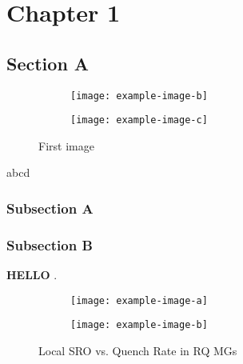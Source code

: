 \chapter{Chapter 1} \label{c:dev}

\lipsum[2-4]

\section{Section A} \label{s:simtestMG}
\lipsum[4] \par

\begin{figure} %
	\centering
	\begin{subfigure}{\textheight} \centering \texttt{[image: example-image-b]}
		 \end{subfigure}%
	\vfill
	\begin{subfigure}{\textheight} \centering \texttt{[image: example-image-c]}
		 \end{subfigure}
	\caption{First image}
	\label{f:rdf_mgs}
\end{figure}

\cbstart
abcd
\cbend 

\lipsum[3] \par

\subsection{Subsection A} \label{s:rdf-mgs}
\begin{changebar}
\lipsum[6] \par

%
\subsection{Subsection B} \label{s:voro-mgs}
\lipsum[5] \par
\end{changebar}

\textbf{HELLO}
\lipsum[3]. \par
	
	\begin{figure}[h] %
		\centering
		\begin{subfigure}{0.45\linewidth} \centering \texttt{[image: example-image-a]}
			\subcaption{} \end{subfigure}%
		\begin{subfigure}{0.45\linewidth} \centering \texttt{[image: example-image-b]}
			\subcaption{} \end{subfigure}
		\caption{Local SRO vs. Quench Rate in RQ MGs}
		\label{f:voro_qr}
	\end{figure}

\lipsum[3]

